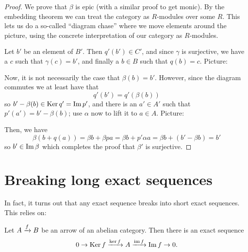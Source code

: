 \begin{proof}
	We prove that $\beta$ is epic (with a similar proof to get monic).
	By the embedding theorem we can treat the category as $R$-modules over some $R$.
	This lets us do a so-called ``diagram chase'' where we move elements around the picture,
	using the concrete interpretation of our category as $R$-modules.

	Let $b'$ be an element of $B'$.
	Then $q'(b') \in C'$, and since $\gamma$ is surjective, we have a $c$ such that $\gamma(c) = b'$,
	and finally a $b \in B$ such that $q(b) = c$.
	Picture:
	\begin{center}
	\end{center}
	Now, it is not necessarily the case that $\beta(b) = b'$.
	However, since the diagram commutes we at least have that
	\[ q'(b') = q'(\beta(b)) \]
	so $b' - \beta(b) \in \operatorname{Ker} q' = \operatorname{Im} p'$, and there is an $a' \in A'$ such that
	$p'(a') = b' - \beta(b)$;
	use $\alpha$ now to lift it to $a \in A$.
	Picture:
	\begin{center}
	\end{center}
	Then, we have
	\[
		\beta(b + q(a)) = \beta b + \beta p a
		= \beta b + p' \alpha a
		= \beta b + (b' - \beta b)
		= b'
	\]
	so $b' \in \operatorname{Im} \beta$ which completes the proof that $\beta'$ is surjective.
\end{proof}

\section{Breaking long exact sequences}

In fact, it turns out that any exact sequence breaks into short exact sequences.
This relies on:
\begin{proposition}
	\label{prop:break_exact}
	Let $A \xrightarrow{f} B$ be an arrow of an abelian category.
	Then there is an exact sequence
	\[ 0 \to \operatorname{Ker} f \xrightarrow{\ker f} A \xrightarrow{\operatorname{im} f} \operatorname{Im} f \to 0. \]
\end{proposition}


